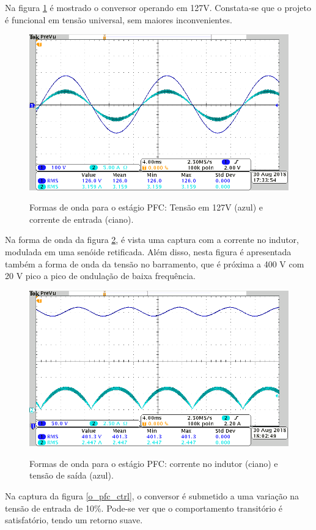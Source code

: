 \documentclass[
        12pt,
        openany, %
        oneside, %
        a4paper,			
        english,			
        brazil
        ]{abntbibufjf}
\begin{document}
Na figura \ref{o_pfc_v_i} é mostrado o conversor operando em 127V. Constata-se que o projeto é funcional em tensão universal, sem maiores inconvenientes.

\begin{figure}[!h]
	\centering
	\caption{Formas de onda para o estágio PFC: Tensão em 127V (azul) e corrente de entrada (ciano).}
	\includegraphics[width=0.7\linewidth]{../GRAFICOS/TEK/tek00042}
	\label{o_pfc_v_i}
\end{figure}



Na forma de onda da figura \ref{o_pfc_ind}, é vista uma captura com a corrente no indutor, modulada em uma senóide retificada. Além disso, nesta figura é apresentada também a forma de onda da tensão no barramento, que é próxima a 400 V com 20 V pico a pico de ondulação de baixa frequência.

\begin{figure}[!h]
	\centering
	\caption{Formas de onda para o estágio PFC: corrente no indutor (ciano) e tensão de saída (azul).}
	\includegraphics[width=0.7\linewidth]{../GRAFICOS/TEK/tek00064}
	\label{o_pfc_ind}
\end{figure}




Na captura da figura \ref{o_pfc_ctrl}, o conversor é submetido a uma variação na tensão de entrada de 10\%. Pode-se ver que o comportamento transitório é satisfatório, tendo um retorno suave.
\end{document}
